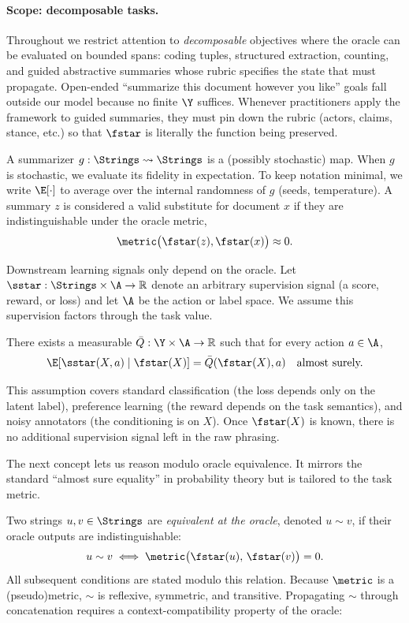 \paragraph{Scope: decomposable tasks.}
Throughout we restrict attention to \emph{decomposable} objectives where the oracle can be evaluated on bounded spans: coding tuples, structured extraction, counting, and guided abstractive summaries whose rubric specifies the state that must propagate. Open-ended ``summarize this document however you like'' goals fall outside our model because no finite $\Y$ suffices. Whenever practitioners apply the framework to guided summaries, they must pin down the rubric (actors, claims, stance, etc.) so that $\fstar$ is literally the function being preserved.

A summarizer $g:\Strings\rightsquigarrow\Strings$ is a (possibly stochastic) map. When $g$ is stochastic, we evaluate its fidelity in expectation. To keep notation minimal, we write $\E[\cdot]$ to average over the internal randomness of $g$ (seeds, temperature). A summary $z$ is considered a valid substitute for document $x$ if they are indistinguishable under the oracle metric,
\[
\metric\big(\fstar(z), \fstar(x)\big)\approx 0.
\]

Downstream learning signals only depend on the oracle. Let $\sstar:\Strings\times\A\to\mathbb{R}$ denote an arbitrary supervision signal (a score, reward, or loss) and let $\A$ be the action or label space. We assume this supervision factors through the task value.

\begin{assumption}\label{ass:CF}
There exists a measurable $\bar Q:\Y\times\A\to\mathbb{R}$ such that for every action $a\in\A$,
\[
\E\!\left[\sstar(X,a)\mid \fstar(X)\right]=\bar Q(\fstar(X),a)\quad\text{almost surely.}
\]
\end{assumption}

This assumption covers standard classification (the loss depends only on the latent label), preference learning (the reward depends on the task semantics), and noisy annotators (the conditioning is on $X$). Once $\fstar(X)$ is known, there is no additional supervision signal left in the raw phrasing.

The next concept lets us reason modulo oracle equivalence. It mirrors the standard ``almost sure equality'' in probability theory but is tailored to the task metric.

\begin{definition}\label{def:oracle-equivalence}
Two strings $u,v\in\Strings$ are \emph{equivalent at the oracle}, denoted $u\sim v$, if their oracle outputs are indistinguishable:
\[
u\sim v
\;\Longleftrightarrow\;
\metric\big(\fstar(u),\,\fstar(v)\big)=0.
\]
All subsequent conditions are stated modulo this relation. Because $\metric$ is a (pseudo)metric, $\sim$ is reflexive, symmetric, and transitive. Propagating $\sim$ through concatenation requires a context-compatibility property of the oracle:
\end{definition}

